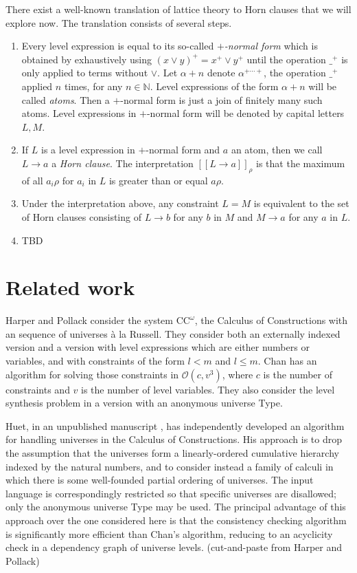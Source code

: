 \documentclass[11pt,a4paper]{article}
\def\Ordo{\mathcal{O}}
\def\CComega{\mathrm{CC}^\omega}
\newcommand{\sct}[1]{[\![#1]\!]}
\begin{document}
There exist a well-known translation of lattice theory to Horn clauses
that we will explore now. The translation consists of several steps.

\begin{enumerate}
\item Every level expression is equal to its so-called
\emph{$+$-normal form} which is obtained by exhaustively using 
$(x\vee y)^+ = x^+ \vee y^+$ until the operation $\_^+$ is only applied
to terms without $\vee$. Let $\alpha+n$ denote $\alpha^{+\cdots+}$, the
operation $\_^+$ applied $n$ times, for any $n\in\mathbb{N}$.
Level expressions of the form $\alpha+n$ will be called \emph{atoms}.
Then a $+$-normal form is just a join of finitely many such atoms.
Level expressions in $+$-normal form will be denoted by capital letters $L,M$.

\item If $L$ is a level expression in $+$-normal form and $a$ an atom,
then we call $L\to a$ a \emph{Horn clause}. The interpretation $\sct{L\to a}_\rho$
is that the maximum of all $a_i\rho$ for $a_i$ in $L$ is greater than or equal $a\rho$.

\item Under the interpretation above, any constraint $L=M$ is
equivalent to the set of Horn clauses consisting of $L\to b$ for any $b$ in $M$
and $M\to a$ for any $a$ in $L$.

\item TBD

\end{enumerate}

\section{Related work}

Harper and Pollack \cite{HarperP91} consider the system $\CComega$, the Calculus of Constructions with an sequence of universes \`a la Russell. They consider both an externally indexed version and a version with level expressions which are either numbers or variables, and with constraints of the form $l < m$ and $l \leq m$. Chan has an algorithm for solving those constraints in $\Ordo(c,v^3)$, where $c$ is the number of constraints and $v$ is the number of level variables. They also consider the level synthesis problem in a version with an anonymous universe Type.

Huet, in an unpublished manuscript \cite{Huet87}, has independently developed an
algorithm for handling universes in the Calculus of Constructions. His approach is to drop the assumption that the universes form a linearly-ordered
cumulative hierarchy indexed by the natural numbers, and to consider instead a family of calculi in which there is some well-founded partial ordering
of universes. The input language is correspondingly restricted so that specific universes are disallowed; only the anonymous universe Type may be
used. The principal advantage of this approach over the one considered here
is that the consistency checking algorithm is significantly more efficient than
Chan's algorithm, reducing to an acyclicity check in a dependency graph of
universe levels. (cut-and-paste from Harper and Pollack)
\end{document}

